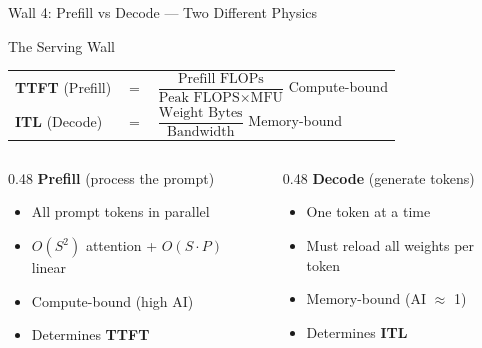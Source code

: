 \documentclass[aspectratio=169, 12pt]{beamer}
\newcommand{\wallbox}[2]{%
  \begin{block}{#1}#2\end{block}%
}
\begin{document}
\begin{frame}{Wall 4: Prefill vs Decode --- Two Different Physics}

\small
\wallbox{The Serving Wall}{
\begin{tabular}{lcl}
  \textbf{TTFT} (Prefill) & $=$ & $\dfrac{\text{Prefill FLOPs}}{\text{Peak FLOPS} \times \text{MFU}}$
  \quad\colorbox{computeblue}{Compute-bound} \\[10pt]
  \textbf{ITL} (Decode)   & $=$ & $\dfrac{\text{Weight Bytes}}{\text{Bandwidth}}$
  \quad\colorbox{datagreen}{Memory-bound}
\end{tabular}
}

\vspace{0.3cm}
\begin{columns}[T]
\begin{column}{0.48\textwidth}
\textbf{Prefill} (process the prompt)
\begin{itemize}\setlength\itemsep{2pt}
  \item All prompt tokens in parallel
  \item $O(S^2)$ attention + $O(S \cdot P)$ linear
  \item Compute-bound (high AI)
  \item Determines \textbf{TTFT}
\end{itemize}
\end{column}
\begin{column}{0.48\textwidth}
\textbf{Decode} (generate tokens)
\begin{itemize}\setlength\itemsep{2pt}
  \item One token at a time
  \item Must reload all weights per token
  \item Memory-bound (AI $\approx$ 1)
  \item Determines \textbf{ITL}
\end{itemize}
\end{column}
\end{columns}
\end{frame}
\end{document}
